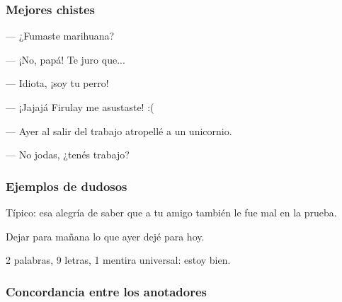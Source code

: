 \begin{frame}
    \frametitle{Mejores chistes}

    \begin{block}{}
        --- ¿Fumaste marihuana?

        --- ¡No, papá! Te juro que...

        --- Idiota, ¡soy tu perro!

        --- ¡Jajajá Firulay me asustaste! :(
    \end{block}{}

    \begin{block}{}
        --- Ayer al salir del trabajo atropellé a un unicornio.

        --- No jodas, ¿tenés trabajo?
    \end{block}{}
\end{frame}

\begin{frame}
    \frametitle{Ejemplos de dudosos}

    \begin{block}{}
        Típico: esa alegría de saber que a tu amigo también le fue mal en la prueba.
    \end{block}{}

    \begin{block}{}
        Dejar para mañana lo que ayer dejé para hoy.
    \end{block}{}

    \begin{block}{}
        2 palabras, 9 letras, 1 mentira universal: estoy bien.
    \end{block}{}
\end{frame}

\subsubsection{Concordancia entre los anotadores}

